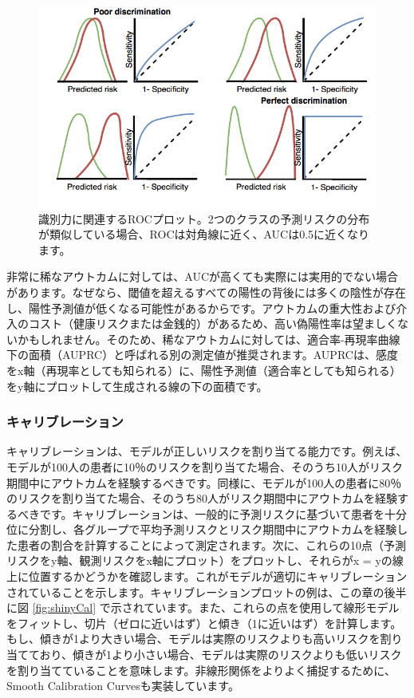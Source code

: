 \documentclass[
  11pt]{book}
\theoremstyle{definition}
\theoremstyle{definition}
\theoremstyle{definition}
\theoremstyle{definition}
\theoremstyle{remark}
\begin{document}
\begin{figure}
\includegraphics[width=1\linewidth]{images/PatientLevelPrediction/theory/roctheory} \caption{識別力に関連するROCプロット。2つのクラスの予測リスクの分布が類似している場合、ROCは対角線に近く、AUCは0.5に近くなります。}\label{fig:figuretheoryroctheory}
\end{figure}

非常に稀なアウトカムに対しては、AUCが高くても実際には実用的でない場合があります。なぜなら、閾値を超えるすべての陽性の背後には多くの陰性が存在し、陽性予測値が低くなる可能性があるからです。アウトカムの重大性および介入のコスト（健康リスクまたは金銭的）があるため、高い偽陽性率は望ましくないかもしれません。そのため、稀なアウトカムに対しては、適合率-再現率曲線下の面積（AUPRC）と呼ばれる別の測定値が推奨されます。AUPRCは、感度をx軸（再現率としても知られる）に、陽性予測値（適合率としても知られる）をy軸にプロットして生成される線の下の面積です。 

\subsubsection*{キャリブレーション}\label{ux30adux30e3ux30eaux30d6ux30ecux30fcux30b7ux30e7ux30f3}

キャリブレーションは、モデルが正しいリスクを割り当てる能力です。例えば、モデルが100人の患者に10％のリスクを割り当てた場合、そのうち10人がリスク期間中にアウトカムを経験するべきです。同様に、モデルが100人の患者に80％のリスクを割り当てた場合、そのうち80人がリスク期間中にアウトカムを経験するべきです。キャリブレーションは、一般的に予測リスクに基づいて患者を十分位に分割し、各グループで平均予測リスクとリスク期間中にアウトカムを経験した患者の割合を計算することによって測定されます。次に、これらの10点（予測リスクをy軸、観測リスクをx軸にプロット）をプロットし、それらがx = yの線上に位置するかどうかを確認します。これがモデルが適切にキャリブレーションされていることを示します。キャリブレーションプロットの例は、この章の後半に図 \ref{fig:shinyCal} で示されています。また、これらの点を使用して線形モデルをフィットし、切片（ゼロに近いはず）と傾き（1に近いはず）を計算します。もし、傾きが1より大きい場合、モデルは実際のリスクよりも高いリスクを割り当てており、傾きが1より小さい場合、モデルは実際のリスクよりも低いリスクを割り当てていることを意味します。非線形関係をよりよく捕捉するために、Smooth Calibration Curvesも実装しています。 
\end{document}
